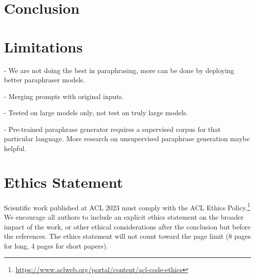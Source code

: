 \documentclass[11pt]{article}
\begin{document}
\section{Conclusion}


\section{Limitations}
- We are not doing the best in paraphrasing, more can be done by deploying better paraphraser models.

- Merging prompts with original inputs.

- Tested on large models only, not test on truly large models.

- Pre-trained paraphrase generator requires a supervised corpus for that particular language. More research on unsupervised paraphrase generation maybe helpful.

\section*{Ethics Statement}
Scientific work published at ACL 2023 must comply with the ACL Ethics Policy.\footnote{\url{https://www.aclweb.org/portal/content/acl-code-ethics}} We encourage all authors to include an explicit ethics statement on the broader impact of the work, or other ethical considerations after the conclusion but before the references. The ethics statement will not count toward the page limit (8 pages for long, 4 pages for short papers).

\begin{comment}
\section*{Acknowledgements}
This document has been adapted by Jordan Boyd-Graber, Naoaki Okazaki, Anna Rogers from the style files used for earlier ACL, EMNLP and NAACL proceedings, including those for
EACL 2023 by Isabelle Augenstein and Andreas Vlachos,
EMNLP 2022 by Yue Zhang, Ryan Cotterell and Lea Frermann,
ACL 2020 by Steven Bethard, Ryan Cotterell and Rui Yan,
ACL 2019 by Douwe Kiela and Ivan Vuli\'{c},
NAACL 2019 by Stephanie Lukin and Alla Roskovskaya,
ACL 2018 by Shay Cohen, Kevin Gimpel, and Wei Lu,
NAACL 2018 by Margaret Mitchell and Stephanie Lukin,
Bib\TeX{} suggestions for (NA)ACL 2017/2018 from Jason Eisner,
ACL 2017 by Dan Gildea and Min-Yen Kan, NAACL 2017 by Margaret Mitchell,
ACL 2012 by Maggie Li and Michael White,
ACL 2010 by Jing-Shin Chang and Philipp Koehn,
ACL 2008 by Johanna D. Moore, Simone Teufel, James Allan, and Sadaoki Furui,
ACL 2005 by Hwee Tou Ng and Kemal Oflazer,
ACL 2002 by Eugene Charniak and Dekang Lin,
and earlier ACL and EACL formats written by several people, including
John Chen, Henry S. Thompson and Donald Walker.
Additional elements were taken from the formatting instructions of the \emph{International Joint Conference on Artificial Intelligence} and the \emph{Conference on Computer Vision and Pattern Recognition}.
\end{comment}
\end{document}

